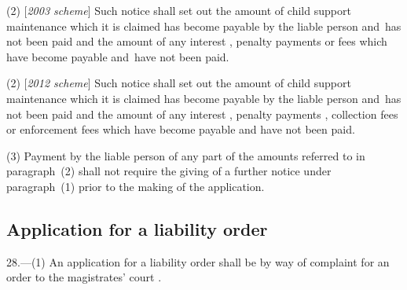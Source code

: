 \documentclass[12pt,a4paper]{article}
\begin{document}
(2) [\emph{2003 scheme}] Such notice shall set out the amount of child support maintenance which it is claimed has become payable by the liable person and~has not been paid and the amount of any interest%
, penalty payments or fees which have become payable and~have not been paid.  %

(2) [\emph{2012 scheme}] Such notice shall set out the amount of child support maintenance which it is claimed has become payable by the liable person and~has not been paid and the amount of any interest%
, penalty payments%
, collection fees or enforcement fees  %
which have become payable and have not been paid.  %

(3) Payment by the liable person of any part of the amounts referred to in paragraph~(2) shall not require the giving of a further notice under paragraph~(1) prior to the making of the application.


\subsection[28. Application for a liability order]{Application for a liability order}

28.—(1) An application for a liability order shall be by way of complaint for an order to the magistrates' court%
.
\end{document}
